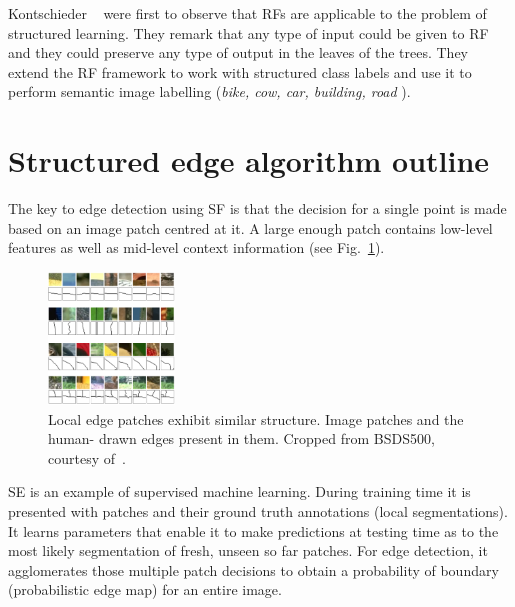 Kontschieder \etal~\cite{KontschiederBBP11} were first to observe that RFs are applicable to the problem of structured learning. They remark that any type of input could be given to RF and they could preserve %
any type of output in the leaves of the trees. They extend the RF framework to work with structured class labels and use it to perform semantic image labelling (\textit{bike, cow, car, building, road \etc}).

\section{Structured edge algorithm outline}
The key to edge detection using SF is that the decision for a single point is made based on an image patch centred at it. A large enough patch contains low-level features as well as mid-level context information (see Fig.~\ref{fig:srf-structure-in-edge-patches}).

\begin{figure}[ht!]
\centering
 \includegraphics[width=0.3\textwidth]{images/srf/structure-in-edge-patches.png}
\caption{Local edge patches exhibit similar structure. Image patches and the human-%
drawn edges present in them. Cropped from BSDS500, courtesy of~\cite{DollarICCV13PresentationSlides}.}
\label{fig:srf-structure-in-edge-patches}
\end{figure}

SE is an example of supervised machine learning. During training time it is presented with patches and their ground truth annotations (local segmentations). It learns parameters that enable it to make predictions at testing time as to the most likely segmentation of fresh, unseen so far patches. For edge detection, it agglomerates those multiple patch decisions to obtain a probability of boundary (probabilistic edge map) for an entire image.

